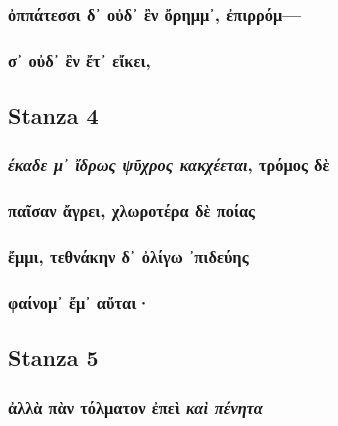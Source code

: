 \subsubsection*{ὀππάτεσσι δ᾽ οὐδ᾽ ἒν ὄρημμ᾽, ἐπιρρόμ---}

\subsubsection*{σ᾽ οὐδ᾽ ἒν ἔτ᾽ εἴκει,}

\subsection*{Stanza 4}
\subsubsection*{\emph{έκαδε μ᾽ ἴδρως ψῦχρος κακχέεται}, τρόμος δὲ}

\subsubsection*{παῖσαν ἄγρει, χλωροτέρα δὲ ποίας}

\subsubsection*{ἔμμι, τεθνάκην δ᾽ ὀλίγω ᾽πιδεύης}

\subsubsection*{φαίνομ᾽ ἔμ᾽ αὔται·}

\subsection*{Stanza 5}
\subsubsection*{ἀλλὰ πὰν τόλματον ἐπεὶ \emph{καὶ πένητα}}
